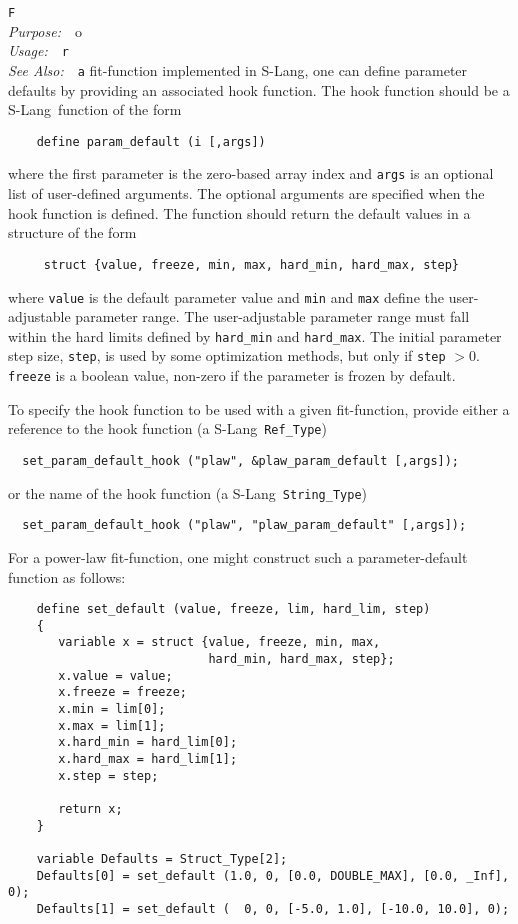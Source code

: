 \documentclass{book}
\makeatletter
\newif\ifpdf
\newcommand{\slang}{{\sc S-Lang}}
\newenvironment{isisfunction}[4]%
{\index{{#1}@{\tt #1}}%
  \ifpdf
  \else
     \addcontentsline{toc}{subsection}{{#1} -- {#2}}
  \fi
  \vbox{
          \vspace*{\baselineskip}
          {\LARGE\tt #1}\vspace*{\baselineskip}\\
          {{\it Purpose:}~~{#2}}\\
          {{\it Usage:}~~{\tt #3}}\\
          {{\it See Also:}~~{\tt #4}}
       }
}%
{ }
\makeatother
\begin{document}
{\begin{isisfunction}
For a fit-function implemented in \slang, one can define parameter defaults by
providing an associated hook function. The hook function should be a \slang\
function of the form
\begin{verbatim}
    define param_default (i [,args])
\end{verbatim}
where the first parameter is the zero-based array index and \verb|args| is an
optional list of user-defined arguments. The optional arguments are specified
when the hook function is defined.  The function should return the default
values in a structure of the form
\begin{verbatim}
     struct {value, freeze, min, max, hard_min, hard_max, step}
\end{verbatim}
where \verb|value| is the default parameter value and \verb|min| and
\verb|max| define the user-adjustable parameter range.  The user-adjustable
parameter range must fall within the hard limits defined by \verb|hard_min|
and \verb|hard_max|.  The initial parameter step size, \verb|step|, is used by
some optimization methods, but only if \verb|step| $> 0$. \verb|freeze| is a
boolean value, non-zero if the parameter is frozen by default.

To specify the hook function to be used with a given fit-function,
provide either a reference to the hook function (a \slang\
\verb|Ref_Type|)
\begin{verbatim}
  set_param_default_hook ("plaw", &plaw_param_default [,args]);
\end{verbatim}
or the name of the hook function (a \slang\ \verb|String_Type|)
\begin{verbatim}
  set_param_default_hook ("plaw", "plaw_param_default" [,args]);
\end{verbatim}

For a power-law fit-function, one might construct such a
parameter-default function as follows:
\begin{verbatim}
    define set_default (value, freeze, lim, hard_lim, step)
    {
       variable x = struct {value, freeze, min, max,
                            hard_min, hard_max, step};
       x.value = value;
       x.freeze = freeze;
       x.min = lim[0];
       x.max = lim[1];
       x.hard_min = hard_lim[0];
       x.hard_max = hard_lim[1];
       x.step = step;

       return x;
    }

    variable Defaults = Struct_Type[2];
    Defaults[0] = set_default (1.0, 0, [0.0, DOUBLE_MAX], [0.0, _Inf], 0);
    Defaults[1] = set_default (  0, 0, [-5.0, 1.0], [-10.0, 10.0], 0);


\end{verbatim}
\end{isisfunction}}
\end{document}
